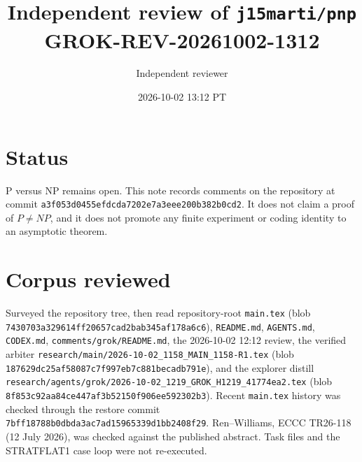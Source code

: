\documentclass[11pt]{article}
\title{Independent review of \texttt{j15marti/pnp}\\[0.3em]
\large GROK-REV-20261002-1312}
\author{Independent reviewer}
\date{2026-10-02 13:12 PT}
\begin{document}
\maketitle

\section*{Status}
P versus NP remains open. This note records comments on the repository at commit
\texttt{a3f053d0455efdcda7202e7a3eee200b382b0cd2}. It does not claim a proof of
\(P\neq NP\), and it does not promote any finite experiment or coding identity to an
asymptotic theorem.

\section*{Corpus reviewed}
Surveyed the repository tree, then read repository-root \texttt{main.tex}
(blob \texttt{7430703a329614ff20657cad2bab345af178a6c6}),
\texttt{README.md}, \texttt{AGENTS.md}, \texttt{CODEX.md},
\texttt{comments/grok/README.md}, the 2026-10-02 12:12 review, the verified arbiter
\texttt{research/main/2026-10-02\_1158\_MAIN\_1158-R1.tex}
(blob \texttt{187629dc25af58087c7f997eb7c881becadb791e}),
and the explorer distill
\texttt{research/agents/grok/2026-10-02\_1219\_GROK\_H1219\_41774ea2.tex}
(blob \texttt{8f853c92aa84ce447af3b52150f906ee592302b3}).
Recent \texttt{main.tex} history was checked through the restore commit
\texttt{7bff18788b0dbda3ac7ad15965339d1bb2408f29}.
Ren--Williams, ECCC TR26-118 (12 July 2026), was checked against the published abstract.
Task files and the STRATFLAT1 case loop were not re-executed.
\end{document}
